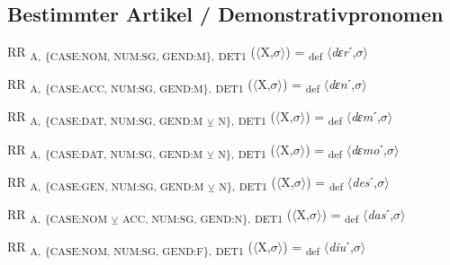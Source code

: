 {\subsection{Bestimmter Artikel / Demonstrativpronomen}

\begin{exe}
 RR \textsubscript{A,} \textsubscript{\{CASE:NOM, NUM:SG, GEND:M\},} \textsubscript{DET1} ($\langle$X,$\sigma $$\rangle$) = \textsubscript{def} $\langle$\textit{dɛr}ˊ,$\sigma $$\rangle$
\end{exe}

\begin{exe}
 RR \textsubscript{A,} \textsubscript{\{CASE:ACC, NUM:SG, GEND:M\},} \textsubscript{DET1} ($\langle$X,$\sigma $$\rangle$) = \textsubscript{def} $\langle$\textit{dɛn}ˊ,$\sigma $$\rangle$
\end{exe}

\begin{exe}
 RR \textsubscript{A,} \textsubscript{\{CASE:DAT, NUM:SG, GEND:M} \textsubscript{${\veebar}$}\textsubscript{ N\},} \textsubscript{DET1} ($\langle$X,$\sigma $$\rangle$) = \textsubscript{def} $\langle$\textit{dɛm}ˊ,$\sigma $$\rangle$
\end{exe}

\begin{exe}
 RR \textsubscript{A,} \textsubscript{\{CASE:DAT, NUM:SG, GEND:M} \textsubscript{${\veebar}$}\textsubscript{ N\},} \textsubscript{DET1} ($\langle$X,$\sigma $$\rangle$) = \textsubscript{def} $\langle$\textit{dɛmo}ˊ,$\sigma $$\rangle$
\end{exe}

\begin{exe}
 RR \textsubscript{A,} \textsubscript{\{CASE:GEN, NUM:SG, GEND:M} \textsubscript{${\veebar}$}\textsubscript{ N\},} \textsubscript{DET1} ($\langle$X,$\sigma $$\rangle$) = \textsubscript{def} $\langle$\textit{des}ˊ,$\sigma $$\rangle$
\end{exe}

\begin{exe}
 RR \textsubscript{A,} \textsubscript{\{CASE:NOM} \textsubscript{${\veebar}$}\textsubscript{ ACC, NUM:SG, GEND:N\},} \textsubscript{DET1} ($\langle$X,$\sigma $$\rangle$) = \textsubscript{def} $\langle$\textit{das}ˊ,$\sigma $$\rangle$
\end{exe}

\begin{exe}
 RR \textsubscript{A,} \textsubscript{\{CASE:NOM, NUM:SG, GEND:F\},} \textsubscript{DET1} ($\langle$X,$\sigma $$\rangle$) = \textsubscript{def} $\langle$\textit{diu}ˊ,$\sigma $$\rangle$
\end{exe}

}
